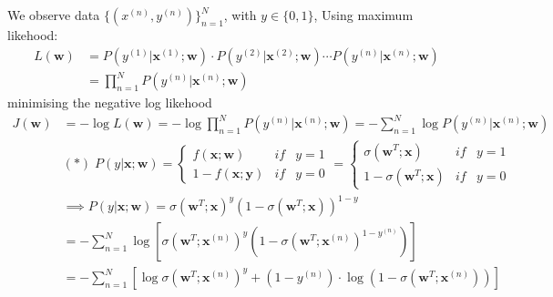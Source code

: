 \documentclass[a4paper, 11pt]{article}
\begin{document}
We observe data $\{(x^{(n)}, y^{(n)})\}_{n = 1}^{N}$, with $y\in\{0, 1\}$, Using maximum likehood:
\begin{align*}
        L(\mathbf{w}) &= P(y^{(1)}|\mathbf{x}^{(1)};\mathbf{w})\cdot P(y^{(2)}|\mathbf{x}^{(2)};\mathbf{w})\cdots P(y^{(n)}|\mathbf{x}^{(n)};\mathbf{w})\\
             &= \prod\limits_{n = 1}^{N}P(y^{(n)}|\mathbf{x}^{(n)};\mathbf{w})
\end{align*}
minimising the negative log likehood
\begin{align*}
        J(\mathbf{w}) &= -\log{L(\mathbf{w})} = -\log{\prod\limits_{n = 1}^{N}P(y^{(n)}|\mathbf{x}^{(n)};\mathbf{w})} = - \sum\limits_{n = 1}^{N}\log{P(y^{(n)}|\mathbf{x}^{(n)};\mathbf{w})}\\
        &(*)\; P(y|\mathbf{x};\mathbf{w}) =\left\{
        \begin{array}{ccc}
                f(\mathbf{x};\mathbf{w}) & if & y = 1\\
                1 - f(\mathbf{x};\mathbf{y}) & if & y = 0
        \end{array}
        \right. = 
        \left\{
        \begin{array}{ccc}
                \sigma(\mathbf{w}^{T};\mathbf{x}) & if & y = 1\\
                1 - \sigma(\mathbf{w}^{T};\mathbf{x}) & if & y = 0
        \end{array}
        \right.\\
        &\implies P(y|\mathbf{x};\mathbf{w}) = \sigma(\mathbf{w}^{T};\mathbf{x})^{y}(1 - \sigma(\mathbf{w}^{T};\mathbf{x}))^{1 - y}\\
        &= -\sum\limits_{n = 1}^{N} \log{[\sigma(\mathbf{w}^{T};\mathbf{x}^{(n)})^{y}(1 - \sigma(\mathbf{w}^{T};\mathbf{x}^{(n)})^{1-y^{(n)}})]}\\
        &= -\sum\limits_{n = 1}^{N} [\log{\sigma(\mathbf{w}^{T};\mathbf{x}^{(n)})^{y}} + (1 - y^{(n)})\cdot\log(1 - \sigma(\mathbf{w}^{T};\mathbf{x}^{(n)}))]
\end{align*}
\end{document}
